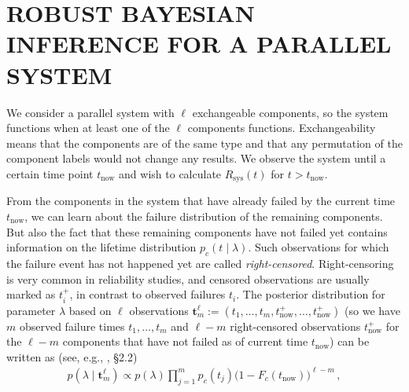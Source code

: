 \documentclass[12pt,a4paper,twocolumn,fleqn]{narms}
\renewcommand{\vec}[1]{{\bm#1}}
\begin{document}
\section{ROBUST BAYESIAN INFERENCE FOR A PARALLEL SYSTEM}
\label{sec:andrewsresults}

We consider a parallel system with $\ell$ exchangeable components,
so the system functions when at least one of the $\ell$ components functions.
Exchangeability means that the components are of the same type
and that any permutation of the component labels would not change any results.
We observe the system until a certain time point $t_\text{now}$
and wish to calculate $R_\text{sys}(t)$ for $t > t_\text{now}$.

From the components in the system that have already failed by the current time $t_\text{now}$,
we can learn about the failure distribution of the remaining components.
But also the fact that these remaining components have not failed yet
contains information on the lifetime distribution $p_c(t\mid \lambda)$.
Such observations for which the failure event has not happened yet are called \emph{right-censored}.
Right-censoring is very common in reliability studies,
and censored observations are usually marked as $t_i^+$, in contrast to observed failures $t_i$.
The posterior distribution for parameter $\lambda$
based on $\ell$ observations $\vec{t}_m^\ell := (t_1,\ldots,t_m,t^+_\text{now},\ldots,t^+_\text{now})$
(so we have $m$ observed failure times $t_1,\ldots,t_m$
and $\ell-m$ right-censored observations $t^+_\text{now}$
for the $\ell-m$ components that have not failed as of current time $t_\text{now}$)
can be written as (see, e.g., , \S 2.2)
\begin{align}
p(\lambda \mid \vec{t}_m^\ell) \propto p(\lambda) \prod_{j=1}^m p_c(t_j) \big(1-F_c(t_\text{now})\big)^{\ell-m}\,,
\end{align}
\end{document}
